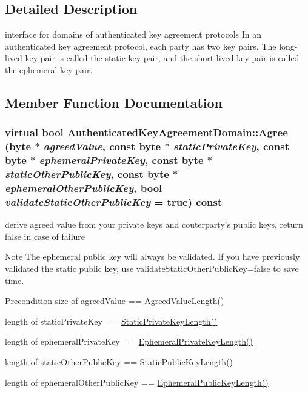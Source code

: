 \subsection{Detailed Description}
interface for domains of authenticated key agreement protocols In an authenticated key agreement protocol, each party has two key pairs. The long-\/lived key pair is called the static key pair, and the short-\/lived key pair is called the ephemeral key pair. 

\subsection{Member Function Documentation}
\hypertarget{class_authenticated_key_agreement_domain_ac9808fb56eacee0c08a9bbd22fe2c98e}{
\subsubsection[{Agree}]{\setlength{\rightskip}{0pt plus 5cm}virtual bool AuthenticatedKeyAgreementDomain::Agree (byte $\ast$ {\em agreedValue}, \/  const byte $\ast$ {\em staticPrivateKey}, \/  const byte $\ast$ {\em ephemeralPrivateKey}, \/  const byte $\ast$ {\em staticOtherPublicKey}, \/  const byte $\ast$ {\em ephemeralOtherPublicKey}, \/  bool {\em validateStaticOtherPublicKey} = {\ttfamily true}) const}}
\label{class_authenticated_key_agreement_domain_ac9808fb56eacee0c08a9bbd22fe2c98e}


derive agreed value from your private keys and couterparty's public keys, return false in case of failure \begin{DoxyNote}{Note}
The ephemeral public key will always be validated. If you have previously validated the static public key, use validateStaticOtherPublicKey=false to save time. 
\end{DoxyNote}
\begin{DoxyPrecond}{Precondition}
size of agreedValue == \hyperlink{class_authenticated_key_agreement_domain_a98ff4ab957b445060f06c95636a098ea}{AgreedValueLength()} 

length of staticPrivateKey == \hyperlink{class_authenticated_key_agreement_domain_a1ede4e454e74031ec0f0786dc2a14ddf}{StaticPrivateKeyLength()} 

length of ephemeralPrivateKey == \hyperlink{class_authenticated_key_agreement_domain_a449deae54019f6dfc9677e721a193004}{EphemeralPrivateKeyLength()} 

length of staticOtherPublicKey == \hyperlink{class_authenticated_key_agreement_domain_aa7a7a1a641b21fb55cfec96cbf029795}{StaticPublicKeyLength()} 

length of ephemeralOtherPublicKey == \hyperlink{class_authenticated_key_agreement_domain_a3dbef507ea4fd300ad8b2afb4d7afbe9}{EphemeralPublicKeyLength()} 
\end{DoxyPrecond}


